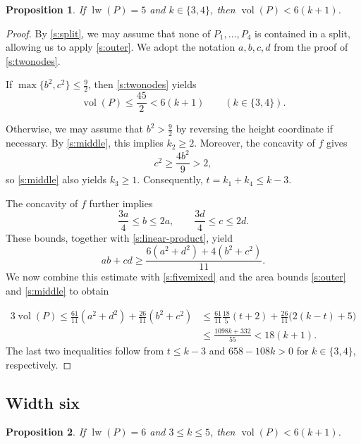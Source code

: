 \documentclass[reqno, 11pt]{article}
\numberwithin{equation}{section}
\newtheorem{proposition}[proposition]{Proposition}
\theoremstyle{definition}
\DeclareMathOperator{\vol}{vol}
\DeclareMathOperator{\lw}{lw}
\numberwithin{equation}{section}
\begin{document}
\begin{proposition}\label{s:five}
If $\lw(P)=5$ and $k\in\{3,4\}$, then $\vol(P)<6(k+1)$.
\end{proposition}
\begin{proof}
By \eqref{s:split}, we may assume that none of $P_1,\ldots,P_4$ is contained in a split, allowing us to apply \eqref{s:outer}. We adopt the notation $a,b,c,d$ from the proof of \cref{s:twonodes}.

If $\max\{b^2,c^2\}\le\frac92$, then \cref{s:twonodes} yields
\[
\vol(P)\le\frac{45}{2}<6(k+1)
\qquad(k\in\{3,4\}).
\]

Otherwise, we may assume that $b^2>\frac92$ by reversing the height coordinate if necessary. By \eqref{s:middle}, this implies $k_2\ge2$. Moreover, the concavity of $f$ gives
\[
c^2\ge\frac{4b^2}{9}>2,
\]
so \eqref{s:middle} also yields $k_3\ge1$. Consequently, $t=k_1+k_4\le k-3$.

The concavity of $f$ further implies
\[
\frac{3a}{4}\le b\le2a,\qquad
\frac{3d}{4}\le c\le2d.
\]
These bounds, together with \eqref{s:linear-product}, yield
\[
ab+cd\ge\frac{6(a^2+d^2)+4(b^2+c^2)}{11}.
\]
We now combine this estimate with \eqref{s:fivemixed} and the area bounds \eqref{s:outer} and \eqref{s:middle} to obtain

\begin{align*}
 3\vol(P)\le\frac{61}{11}(a^2+d^2)+\frac{26}{11}(b^2+c^2)
 &\le\frac{61}{11}\frac{18}{5}(t+2)+\frac{26}{11}\bigl(2(k-t)+5\bigr)
 \\& \le\frac{1098k+332}{55}<18(k+1).
 \end{align*}
The last two inequalities follow from $t\le k-3$ and $658-108k>0$ for $k\in\{3,4\}$, respectively.
\end{proof}



\subsection{Width six}

\begin{proposition}\label{s:six}
If $\lw(P)=6$ and $3\le k\le5$, then $\vol(P)<6(k+1)$.
\end{proposition}
\end{document}
